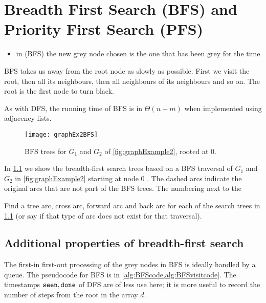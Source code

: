 \chapter{Breadth First Search (BFS) and Priority First Search (PFS)}

\begin{itemize}
\item in  (BFS) the new grey node chosen is the one
that has been grey for the  time
\end{itemize}
 
BFS takes us away from the root node as slowly as possible. 
First we visit the root, then all its neighbours, then all neighbours of its neighbours and so on. 
The root is the first node to turn black.

As with DFS, the running time of BFS is in $\Theta(n+m)$ when implemented using adjacency lists.

\begin{figure}[hbtp]
	\centering
	\texttt{[image: graphEx2BFS]}
	\caption{BFS trees for $G_1$ and $G_2$ of \cref{fig:graphExample2}, rooted at $0$.}
	\label{fig:graphEx2-BFS}
\end{figure}

\begin{Example}
In \cref{fig:graphEx2-BFS} we show the breadth-first search trees based on a BFS traversal of $G_1$ and $G_2$ in \cref{fig:graphExample2} starting at node $0$ . The
dashed arcs indicate the original arcs that are not part of the BFS trees. The numbering next to the 
\end{Example}

\begin{Boxample}[2]
Find a tree arc, cross arc, forward arc and back arc for each of the search trees in \cref{fig:graphEx2-BFS} (or say if that type of arc does not exist for that traversal).
\end{Boxample}

\section{Additional properties of breadth-first search}
\label{sec:bfs}

The first-in first-out processing of the grey nodes in BFS is ideally
handled by a queue. The pseudocode for BFS is in \cref{alg:BFScode,alg:BFSvisitcode}.
The timestamps $\seen, \done$ of DFS are of less use here;
it is more useful to record the number of steps from the root in the
array $d$.


